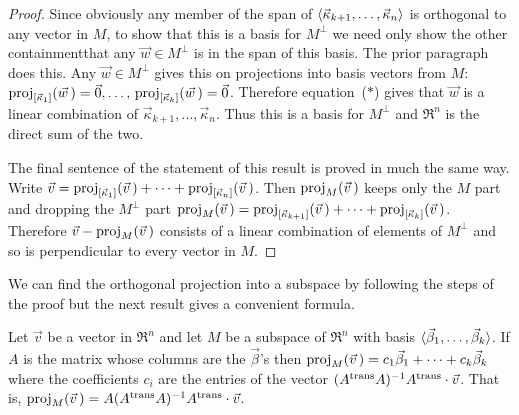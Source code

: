 \begin{proof}
Since obviously any member of the span of
\( \sequence{\vec{\kappa}_{k+1},\dots,\vec{\kappa}_n} \)
is orthogonal to any vector in $M$, to show that this is a basis for $M^\perp$
we need only show the other 
containment\Dash that any $\vec{w}\in M^\perp$ is in
the span of this basis.
The prior paragraph does this.
Any $\vec{w}\in M^\perp$ gives this
on projections into basis vectors from $M$:
$\proj{\vec{w}\,}{\spanof{\vec{\kappa}_1}}=\zero,
\dots,\,\proj{\vec{w}\,}{\spanof{\vec{\kappa}_k}}=\zero$.
Therefore equation~($*$) gives that $\vec{w}$ is a linear combination of 
\( \vec{\kappa}_{k+1},\dots,\vec{\kappa}_n \).
Thus this is a basis for $M^\perp$ and
$\Re^n$ is the direct sum of the two.

The final sentence of the statement of this result 
is proved in much the same way.
Write $\vec{v}=\proj{\vec{v}\,}{\spanof{\vec{\kappa}_1}}
           +\dots+\proj{\vec{v}\,}{\spanof{\vec{\kappa}_n}}$.
Then $\proj{\vec{v}\,}{M}$ keeps only the $M$ part and
dropping the $M^\perp$ part
$\proj{\vec{v}\,}{M}=\proj{\vec{v}\,}{\spanof{\vec{\kappa}_{k+1}}}
                       +\dots+\proj{\vec{v}\,}{\spanof{\vec{\kappa}_k}}$.
Therefore $\vec{v}-\proj{\vec{v}\,}{M}$ consists of a linear combination
of elements of $M^\perp$ and so is perpendicular to every vector in $M$.
\end{proof}

We can find the orthogonal projection into a subspace by 
following the steps of the proof but the next result gives a 
convenient formula.

\begin{theorem} \label{th:OrthProjMat}
Let $\vec{v}$ be a vector in $\Re^n$ and 
let \( M \) be a subspace of \( \Re^n \) with basis
\( \sequence{\vec{\beta}_1,\dots,\vec{\beta}_k} \). 
If \( A \) is the matrix whose columns are the \( \vec{\beta} \)'s
then $\proj{\vec{v}\,}{M}=c_1\vec{\beta}_1+\dots+c_k\vec{\beta}_k$
where the coefficients $c_i$ are the entries of the vector
$(\trans{A}A)^{-1}\trans{A}\cdot\vec{v}$.
That is, 
$\proj{\vec{v}\,}{M}=A(\trans{A}A)^{-1}\trans{A}\cdot\vec{v}$.
\end{theorem}

